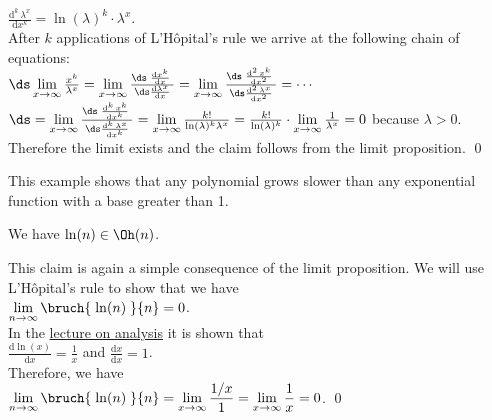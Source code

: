  $\displaystyle \frac{\mathrm{d}^k\,\lambda^{x}}{\mathrm{d}x^k} = \ln(\lambda)^k \cdot \lambda^x$. \\[0.2cm]
After $k$ applications of L'H\^opital's rule we arrive at the following chain of equations:
\\[0.2cm]
\hspace*{1.3cm} 
$\ds 
\lim\limits_{x \rightarrow \infty} \frac{x^{k}}{\lambda^x} =
\lim\limits_{x \rightarrow \infty} \frac{\ds\;\frac{\mathrm{d}x^{k}}{\mathrm{d}x}\;}{\ds\frac{\mathrm{d}\lambda^x}{\mathrm{d}x}} =
\lim\limits_{x \rightarrow \infty} \frac{\ds\;\frac{\mathrm{d}^2\,x^{k}}{\mathrm{d}x^2}\;}{\ds\frac{\mathrm{d}^2\,\lambda^x}{\mathrm{d}x^2}} =
\cdots$
\\[0.3cm]
\hspace*{2.8cm}
$\ds = 
\lim\limits_{x \rightarrow \infty} \frac{\ds\;\frac{\mathrm{d}^k\,x^{k}}{\mathrm{d}x^k}\;}{\ds\frac{\mathrm{d}^k\,\lambda^x}{\mathrm{d}x^k}} =
\lim\limits_{x \rightarrow \infty} \frac{k!}{\ln(\lambda)^k \lambda^x} =
\frac{k!}{\ln(\lambda)^k} \cdot \lim\limits_{x \rightarrow \infty} \frac{1}{\lambda^x} = 0$ \quad because
$\lambda > 0$.
\\[0.2cm] 
Therefore the limit exists and the claim follows from the limit proposition.
\qed

\remark
This example shows that any polynomial grows slower than any exponential function with a base greater than 1.
\eoxs

\example
We have $\ln(n) \in \Oh(n)$.
\ex

\proof
This claim is again a simple consequence of the limit proposition.  We will use L'H\^opital's rule
to show that we have
\\[0.4cm]
\hspace*{1.3cm} 
$\lim\limits_{n \rightarrow \infty} \bruch{\;\ln(n)\;}{n} = 0$.
\\[0.2cm]
In the \href{https://github.com/karlstroetmann/Analysis/blob/master/Skript/analysis.pdf}{lecture on analysis}
it is shown that \\[0.2cm] 
\hspace*{1.3cm} $\displaystyle \frac{\mathrm{d} \ln(x)}{\mathrm{d}x} = \frac{1}{x}$ 
\quad and \quad
 $\displaystyle \frac{\mathrm{d} x}{\mathrm{d}x} = 1$. \\[0.2cm]
Therefore, we have \\[0.2cm]
\hspace*{1.3cm} 
$\displaystyle \lim\limits_{n \rightarrow \infty} \bruch{\;\ln(n)\;}{n} = 
\lim\limits_{x \rightarrow \infty} \frac{1/x}{1} = 
\lim\limits_{x \rightarrow \infty} \frac{1}{x} = 0$. \qed


